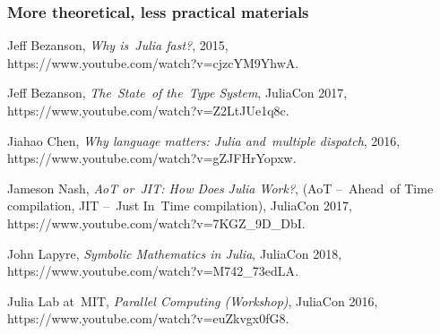 \documentclass[10pt,t]{beamer}
\begin{document}
\begin{frame}
  \frametitle{More theoretical, less practical materials}



  Jeff Bezanson, \textit{Why is~Julia fast?}, 2015, \\
  {https://www.youtube.com/watch?v=cjzcYM9YhwA}.

  \vspace{0.3em}



  Jeff Bezanson, \textit{The~State~of the~Type System},
  JuliaCon 2017, \\
  {https://www.youtube.com/watch?v=Z2LtJUe1q8c}.

  \vspace{0.3em}



  Jiahao Chen, \textit{Why language matters: Julia
    and~multiple dispatch}, 2016, \\
  {https://www.youtube.com/watch?v=gZJFHrYopxw}.

  \vspace{0.3em}



  Jameson Nash, \textit{AoT or~JIT: How Does Julia Work?}, (AoT
  --~Ahead~of Time compilation, JIT --~Just In~Time
  compilation), JuliaCon 2017, \\
  {https://www.youtube.com/watch?v=7KGZ\_9D\_DbI}.

  \vspace{0.3em}



  John Lapyre, \textit{Symbolic Mathematics in Julia}, JuliaCon 2018, \\
  {https://www.youtube.com/watch?v=M742\_73edLA}.

  \vspace{0.3em}



  Julia Lab at~MIT, \textit{Parallel Computing (Workshop)},
  JuliaCon 2016, \\
  {https://www.youtube.com/watch?v=euZkvgx0fG8}.

\end{frame}
\end{document}
